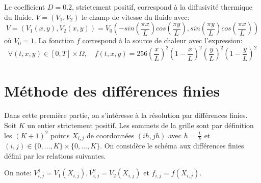 \documentclass[
  11pt,
  dvipsnames]{article}
\begin{document}
Le coefficient \(D=0.2\), strictement positif, correspond à la diffusivité thermique du fluide. \(V = (V_1,V_2)\) le champ de vitesse du fluide avec:
\[ V = (V_1(x,y),V_2(x,y)) = V_0 (-sin(\frac{\pi x}{L})cos(\frac{\pi y}{L}),sin(\frac{\pi y}{L})cos(\frac{\pi x}{L}))\]
où \(V_0 = 1\). La fonction \(f\) correspond à la source de chaleur avec l'expression:
\[\forall(t,x,y) \in [0,T] \times \Omega, \quad f(t,x,y)=256(\frac{x}{L})^2 (1-\frac{x}{L})^2(\frac{y}{L})^2 (1-\frac{y}{L})^2\]

\hypertarget{muxe9thode-des-diffuxe9rences-finies}{%
\section{Méthode des différences finies}\label{muxe9thode-des-diffuxe9rences-finies}}

Dans cette première partie, on s'intéresse à la résolution par différences finies. Soit \(K\) un entier strictement positif. Les sommets de la grille sont par définition les \((K + 1)^2\) points \(X_{i,j}\) de coordonnées \((ih,jh)\) avec \(h =\frac{L}{k}\) et \((i,j) \in \{0,\dots,K\} \times \{0,\dots,K\}\). On considère le schéma aux différences finies défini par les relations suivantes.

On note: \(V_{i,j}^1=V_1(X_{i,j}),V_{i,j}^2=V_2(X_{i,j})\) et \(f_{i,j}=f(X_{i,j})\).
\end{document}
